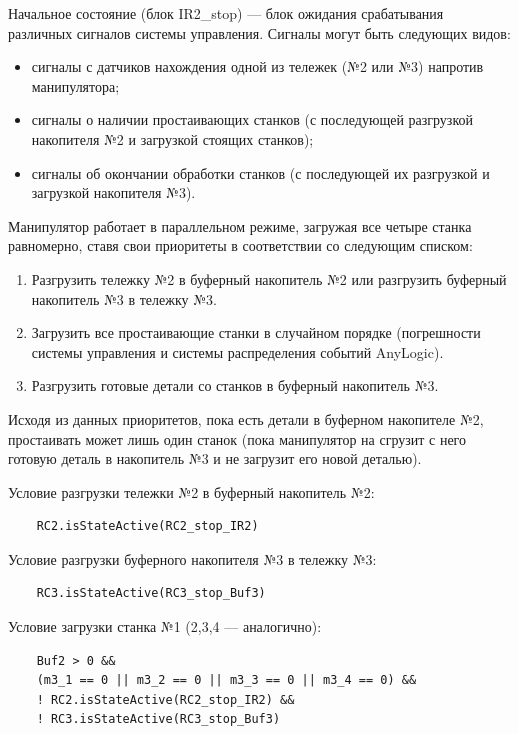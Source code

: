 Начальное состояние (блок IR2\_stop) --- блок ожидания срабатывания различных сигналов системы управления. Сигналы могут быть следующих видов:

\begin{itemize}
    \item сигналы с датчиков нахождения одной из тележек (№2 или №3) напротив манипулятора;
    \item сигналы о наличии простаивающих станков (с последующей разгрузкой накопителя №2 и загрузкой стоящих станков);
    \item сигналы об окончании обработки станков (с последующей их разгрузкой и загрузкой накопителя №3).
\end{itemize}

Манипулятор работает в параллельном режиме, загружая все четыре станка равномерно, ставя свои приоритеты в соответствии со следующим списком:

\begin{enumerate}
    \item Разгрузить тележку №2 в буферный накопитель №2 или разгрузить буферный накопитель №3 в тележку №3.
    \item Загрузить все простаивающие станки в случайном порядке (погрешности системы управления и системы распределения событий AnyLogic).
    \item Разгрузить готовые детали со станков в буферный накопитель №3.
\end{enumerate}

Исходя из данных приоритетов, пока есть детали в буферном накопителе №2, простаивать может лишь один станок (пока манипулятор на сгрузит с него готовую деталь в накопитель №3 и не загрузит его новой деталью).

Условие разгрузки тележки №2 в буферный накопитель №2:

\begin{verbatim}
    RC2.isStateActive(RC2_stop_IR2)
\end{verbatim}

Условие разгрузки буферного накопителя №3 в тележку №3:

\begin{verbatim}
    RC3.isStateActive(RC3_stop_Buf3)
\end{verbatim}

Условие загрузки станка №1 (2,3,4 --- аналогично):

\begin{verbatim}
    Buf2 > 0 &&
    (m3_1 == 0 || m3_2 == 0 || m3_3 == 0 || m3_4 == 0) &&
    ! RC2.isStateActive(RC2_stop_IR2) &&
    ! RC3.isStateActive(RC3_stop_Buf3)
\end{verbatim}

